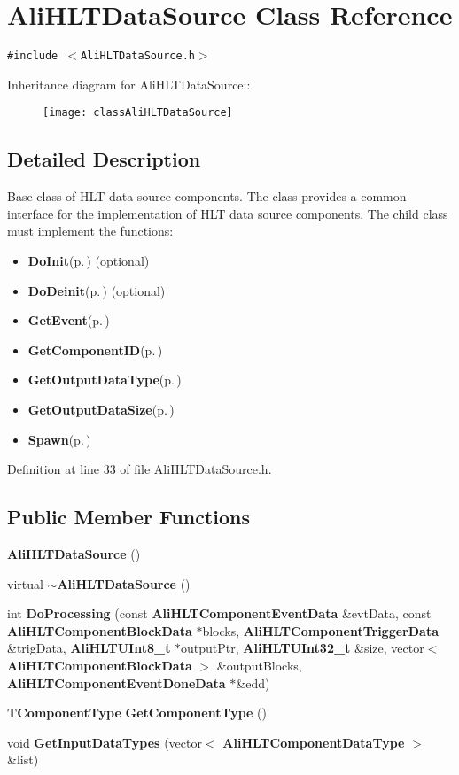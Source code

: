 \section{Ali\-HLTData\-Source Class Reference}
\label{classAliHLTDataSource}
{\tt \#include $<$Ali\-HLTData\-Source.h$>$}

Inheritance diagram for Ali\-HLTData\-Source::\begin{figure}[H]
\begin{center}
\leavevmode
\texttt{[image: classAliHLTDataSource]}
\end{center}
\end{figure}


\subsection{Detailed Description}
Base class of HLT data source components. The class provides a common interface for the implementation of HLT data source components. The child class must implement the functions:\begin{itemize}
\item {\bf Do\-Init}{\rm (p.\,\pageref{classAliHLTComponent_b5})} (optional)\item {\bf Do\-Deinit}{\rm (p.\,\pageref{classAliHLTComponent_b6})} (optional)\item {\bf Get\-Event}{\rm (p.\,\pageref{classAliHLTDataSource_d0})}\item {\bf Get\-Component\-ID}{\rm (p.\,\pageref{classAliHLTComponent_a9})}\item {\bf Get\-Output\-Data\-Type}{\rm (p.\,\pageref{classAliHLTComponent_a11})}\item {\bf Get\-Output\-Data\-Size}{\rm (p.\,\pageref{classAliHLTComponent_a12})}\item {\bf Spawn}{\rm (p.\,\pageref{classAliHLTComponent_a13})} \end{itemize}




Definition at line 33 of file Ali\-HLTData\-Source.h.\subsection*{Public Member Functions}
\begin{CompactItemize}
\item 
{\bf Ali\-HLTData\-Source} ()
\item 
virtual {\bf $\sim$Ali\-HLTData\-Source} ()
\item 
int {\bf Do\-Processing} (const {\bf Ali\-HLTComponent\-Event\-Data} \&evt\-Data, const {\bf Ali\-HLTComponent\-Block\-Data} $\ast$blocks, {\bf Ali\-HLTComponent\-Trigger\-Data} \&trig\-Data, {\bf Ali\-HLTUInt8\_\-t} $\ast$output\-Ptr, {\bf Ali\-HLTUInt32\_\-t} \&size, vector$<$ {\bf Ali\-HLTComponent\-Block\-Data} $>$ \&output\-Blocks, {\bf Ali\-HLTComponent\-Event\-Done\-Data} $\ast$\&edd)
\item 
{\bf TComponent\-Type} {\bf Get\-Component\-Type} ()
\item 
void {\bf Get\-Input\-Data\-Types} (vector$<$ {\bf Ali\-HLTComponent\-Data\-Type} $>$ \&list)
\end{CompactItemize}
